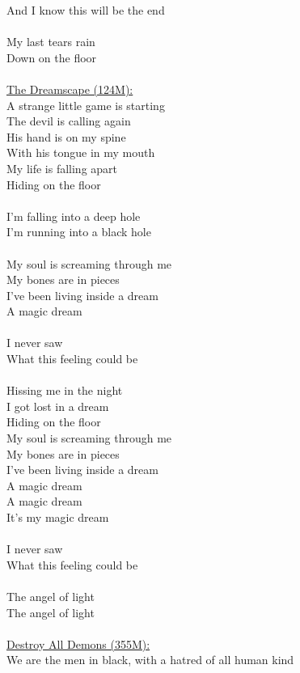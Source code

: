 \documentclass[11pt]{article}
\begin{document}
And I know this will be the end\\
\\
My last tears rain\\
Down on the floor\\
\\
\underline{The Dreamscape (124M):}\\
A strange little game is starting\\
The devil is calling again\\
His hand is on my spine\\
With his tongue in my mouth\\
My life is falling apart\\
Hiding on the floor\\
\\
I'm falling into a deep hole\\
I'm running into a black hole\\
\\
My soul is screaming through me\\
My bones are in pieces\\
I've been living inside a dream\\
A magic dream\\
\\
I never saw\\
What this feeling could be\\
\\
Hissing me in the night\\
I got lost in a dream\\
Hiding on the floor\\
My soul is screaming through me\\
My bones are in pieces\\
I've been living inside a dream\\
A magic dream\\
A magic dream\\
It's my magic dream\\
\\
I never saw\\
What this feeling could be\\
\\
The angel of light\\
The angel of light\\
\\
\underline{Destroy All Demons (355M):}\\
We are the men in black, with a hatred of all human kind\\
\end{document}
